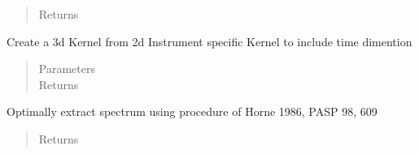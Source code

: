 \documentclass[a4paper,11pt,english]{sphinxmanual}
\begin{document}
\begin{fulllineitems}
\begin{fulllineitems}
\begin{quote}
\begin{description}
\begin{itemize}
\end{itemize}

\item[{Returns}] \leavevmode
{}

\end{description}\end{quote}

\end{fulllineitems}


\begin{fulllineitems}
\label{\detokenize{cascade.TSO:cascade.TSO.TSO.TSOSuite._create_3dKernel}}
Create a 3d Kernel from 2d Instrument specific Kernel
to include time dimention
\begin{quote}\begin{description}
\item[{Parameters}] \leavevmode
{} \textendash{} 

\item[{Returns}] \leavevmode
{}

\end{description}\end{quote}

\end{fulllineitems}


\begin{fulllineitems}
\label{\detokenize{cascade.TSO:cascade.TSO.TSO.TSOSuite.optimal_extraction}}
Optimally extract spectrum using procedure of
Horne 1986, PASP 98, 609
\begin{quote}\begin{description}
\item[{Returns}] \leavevmode
{}

\end{description}\end{quote}

\end{fulllineitems}


\end{fulllineitems}
\end{document}
